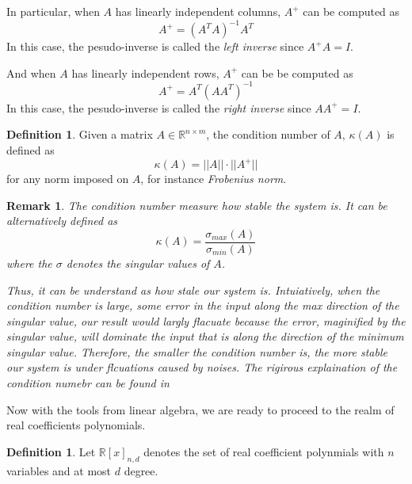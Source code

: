 \documentclass[12pt]{amsart}
\numberwithin{equation}{section}
\newtheorem{remark}[thm]{Remark}
\theoremstyle{definition}
\newtheorem{definition}[thm]{Definition}
\numberwithin{thm}{section}
\begin{document}
     In particular, when $A$ has linearly independent columns, $A^+$ can be computed as
     \begin{equation}
          A^+ = (A^T A)^{-1} A^T
     \end{equation}
     In this case, the pesudo-inverse is called the \emph{left inverse} since $A^+ A = I$.

     \smallskip
     And when $A$ has linearly independent rows, $A^+$ can be be computed as
     \begin{equation}
          A^+ = A^T (A A^T)^{-1}
     \end{equation}
     In this case, the pesudo-inverse is called the \emph{right inverse} since $A A^+ = I$. 


\begin{definition}
     Given a matrix $A \in \mathbb{R}^{n \times m}$, the condition number of $A$, $\kappa(A)$ is defined as
     \begin{equation}
          \kappa(A) = ||A|| \cdot ||A^+||
     \end{equation}
     for any norm imposed on $A$, for instance \emph{Frobenius norm}.
\end{definition}

\begin{remark}
     The condition number measure how stable the system is. It can be alternatively defined as
     \begin{equation}
          \kappa(A) = \frac{\sigma_{max} (A)}{\sigma_{min} (A)}
     \end{equation}
     where the $\sigma$ denotes the singular values of $A$.

     Thus, it can be understand as how stale our system is. 
     Intuiatively, when the condition number is large, some error in the input along the max direction of the singular value,
     our result would largly flacuate because the error, maginified by the singular value, will dominate the input that is along
     the direction of the minimum singular value. 
     Therefore, the smaller the condition number is, the more stable our system is under flcuations caused by noises.
     The rigirous explaination of the condition numebr can be found in \cite{Cheney:Kincaid}
\end{remark}

\smallskip

Now with the tools from linear algebra, we are ready to proceed to the realm of real coefficients polynomials.

\begin{definition}
     Let $\mathbb{R}[x]_{n,d}$ denotes the set of real coefficient 
     polynmials with $n$ variables and at most $d$ degree.
\end{definition}
\end{document}
